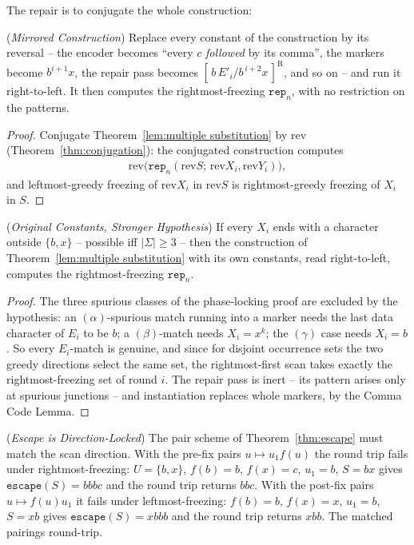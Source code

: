 \documentclass[runningheads,envcountsect]{llncs}
\begin{document}
The repair is to conjugate the whole construction:

\begin{theorem}
    (\emph{Mirrored Construction})
    \label{thm:r2l-mirror}
    Replace every constant of the construction by its reversal -- the encoder becomes ``every $c$ \emph{followed} by its comma'', the markers become $b^{i+1}x$, the repair pass becomes $[\,b\,E'_i/b^{\,i+2}x\,]^{\mathrm{R}}$, and so on -- and run it right-to-left. It then computes the rightmost-freezing $\mathtt{rep}_n$, with no restriction on the patterns.
\end{theorem}

\begin{proof}
    Conjugate Theorem~\ref{lem:multiple substitution} by $\mathrm{rev}$ (Theorem~\ref{thm:conjugation}): the conjugated construction computes
    \begin{align}
        \mathrm{rev}\big(\mathtt{rep}_n(\mathrm{rev}S;\,\mathrm{rev}X_i, \mathrm{rev}Y_i)\big),
    \end{align}
    and leftmost-greedy freezing of $\mathrm{rev}X_i$ in $\mathrm{rev}S$ is rightmost-greedy freezing of $X_i$ in $S$.
\end{proof}

\begin{theorem}
    (\emph{Original Constants, Stronger Hypothesis})
    \label{thm:r2l-ends}
    If every $X_i$ ends with a character outside $\{b, x\}$ -- possible iff $|\Sigma| \geq 3$ -- then the construction of Theorem~\ref{lem:multiple substitution} with its own constants, read right-to-left, computes the rightmost-freezing $\mathtt{rep}_n$.
\end{theorem}

\begin{proof}
    The three spurious classes of the phase-locking proof are excluded by the hypothesis: an $(\alpha)$-spurious match running into a marker needs the last data character of $E_i$ to be $b$; a $(\beta)$-match needs $X_i = x^k$; the $(\gamma)$ case needs $X_i = b$. So every $E_i$-match is genuine, and since for disjoint occurrence sets the two greedy directions select the same set, the rightmost-first scan takes exactly the rightmost-freezing set of round $i$. The repair pass is inert -- its pattern arises only at spurious junctions -- and instantiation replaces whole markers, by the Comma Code Lemma.
\end{proof}

\begin{proposition}
    (\emph{Escape is Direction-Locked})
    \label{prop:escape-lock}
    The pair scheme of Theorem~\ref{thm:escape} must match the scan direction. With the pre-fix pairs $u \mapsto u_1f(u)$ the round trip fails under rightmost-freezing: $U = \{b, x\}$, $f(b) = b$, $f(x) = c$, $u_1 = b$, $S = bx$ gives $\mathtt{escape}(S) = bbbc$ and the round trip returns $bbc$. With the post-fix pairs $u \mapsto f(u)u_1$ it fails under leftmost-freezing: $f(b) = b$, $f(x) = x$, $u_1 = b$, $S = xb$ gives $\mathtt{escape}(S) = xbbb$ and the round trip returns $xbb$. The matched pairings round-trip.
\end{proposition}
\end{document}
